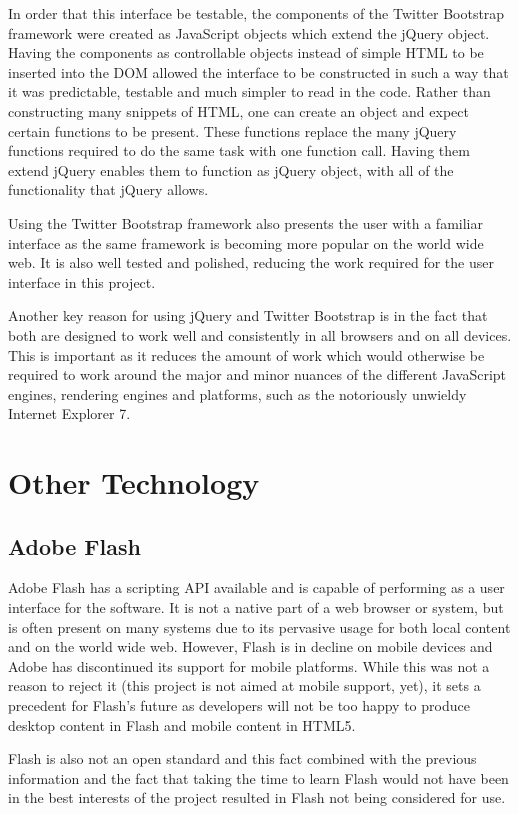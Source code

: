In order that this interface be testable, the components of the Twitter Bootstrap framework were created as Java\-Script objects which extend the jQuery object. Having the components as controllable objects instead of simple HTML to be inserted into the DOM allowed the interface to be constructed in such a way that it was predictable, testable and much simpler to read in the code. Rather than constructing many snippets of HTML, one can create an object and expect certain functions to be present. These functions replace the many jQuery functions required to do the same task with one function call. Having them extend jQuery enables them to function as jQuery object, with all of the functionality that jQuery allows.

Using the Twitter Bootstrap framework also presents the user with a familiar interface as the same framework is becoming more popular on the world wide web. It is also well tested and polished, reducing the work required for the user interface in this project.

Another key reason for using jQuery and Twitter Bootstrap is in the fact that both are designed to work well and consistently in all browsers and on all devices. This is important as it reduces the amount of work which would otherwise be required to work around the major and minor nuances of the different Java\-Script engines, rendering engines and platforms, such as the notoriously unwieldy Internet Explorer 7.

\section{Other Technology}
\subsection{Adobe Flash}
Adobe Flash has a scripting API available and is capable of performing as a user interface for the software. It is not a native part of a web browser or system, but is often present on many systems due to its pervasive usage for both local content and on the world wide web. However, Flash is in decline on mobile devices and Adobe has discontinued its support for mobile platforms. While this was not a reason to reject it (this project is not aimed at mobile support, yet), it sets a precedent for Flash's future as developers will not be too happy to produce desktop content in Flash and mobile content in HTML5.

Flash is also not an open standard and this fact combined with the previous information and the fact that taking the time to learn Flash would not have been in the best interests of the project resulted in Flash not being considered for use.
